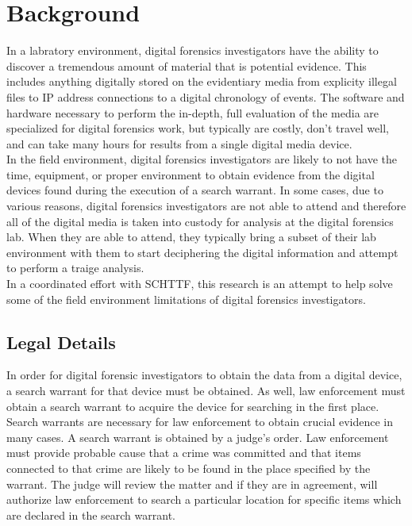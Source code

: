 \documentclass[12pt]{article}
\begin{document}
\section{Background}
\label{sect-background}

In a labratory environment, digital forensics investigators have the ability to discover
a tremendous amount of material that is potential evidence.  This includes anything 
digitally stored on the evidentiary media from
explicity illegal files to IP address connections to a digital chronology of
events.\cite{raghavan2013digital}\cite{rogers2006computer}
The software and hardware necessary to perform the
in-depth, full evaluation of the media are specialized for digital forensics 
work, but typically are costly, don't travel well, and can take many hours for
results from a single digital media device.\\

In the field environment, digital forensics
investigators are likely to not have the time, equipment, or proper environment to
obtain evidence from the digital devices found during the execution of a search
warrant.  In some cases, due to various reasons, digital forensics investigators
are not able to attend and therefore all of the digital media is taken into
custody for analysis at the digital forensics lab.  When they are able to attend,
they typically
bring a subset of their lab environment with them to start deciphering
the digital information and attempt to perform a traige analysis.\\

In a coordinated effort with SCHTTF, this research is an attempt to help
solve some of the field environment limitations of digital forensics investigators.


\subsection{Legal Details}
In order for digital forensic investigators to obtain the data from a digital device,
a search warrant for that device must be obtained.  As well, law enforcement must
obtain a search warrant to acquire the device for searching in the first place.\\

Search warrants are necessary for law enforcement to obtain crucial evidence in many
cases.  A search warrant is obtained by a judge's order.  Law enforcement must 
provide probable cause that a crime 
was committed and that items connected to that crime are likely to be found 
in the place specified by the warrant.  The judge will review the matter and if
they are in agreement, will authorize law enforcement to search a particular location
for specific items which are declared in the search warrant.\\
\end{document}
